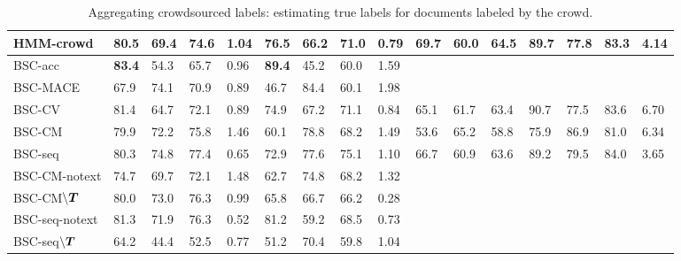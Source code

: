 \begin{table}
\begin{tabularx}{\textwidth}{p{2.0cm} X X X X X X X X X X X X X X X }
HMM-crowd & 80.5 & 69.4 & 74.6 & %
1.04 &  76.5 & 66.2 & 71.0 & 0.79 & %
69.7 & 60.0 & 64.5 & 89.7 & 77.8 & 83.3 & 4.14
\\ 
\midrule
BSC-acc & \textbf{83.4} & 54.3 & 65.7 & %
0.96 &  \textbf{89.4} & 45.2 & 60.0 & %
1.59 &  \\ 
BSC-MACE & 67.9 & 74.1 & 70.9 & %
0.89 &  46.7 & 84.4 & 60.1 & %
 1.98 & \\ 
BSC-CV & 81.4 & 64.7 & 72.1 & %
0.89 &  74.9 & 67.2 & 71.1 & %
 0.84 & 
65.1 & 61.7 & 63.4 & 90.7 & 77.5 & 83.6 & 6.70 
 \\ 
BSC-CM & 79.9 & 72.2 & 75.8 & %
1.46 & 60.1 & 78.8 & 68.2 & %
1.49 & 
53.6 & 65.2 & 58.8 & 75.9 & 86.9 & 81.0 & 6.34 \\ 
BSC-seq & 80.3 & 74.8 & 77.4 & %
0.65 & 
72.9 & 77.6 & 75.1 & %
1.10 & 66.7 & 60.9 & 63.6 & 89.2 & 79.5 & 84.0 & 
3.65 \\ \midrule
BSC-CM-notext & 74.7 & 69.7 & 72.1 & 1.48 & 62.7 & 74.8 & 68.2 & 1.32 & \\
BSC-CM$\backslash\boldsymbol T$ & 80.0 & 73.0 & 76.3 & 0.99 & 65.8 & 66.7 & 66.2 & 0.28 & \\
BSC-seq-notext & 81.3 & 71.9 & 76.3 & 0.52 & 81.2 & 59.2 & 68.5 & 0.73 &\\ 
BSC-seq$\backslash\boldsymbol T$ & 64.2 & 44.4 & 52.5 & 0.77 & 51.2 & 70.4 & 59.8 & 1.04 &\\
\bottomrule  %
\end{tabularx}
\caption{Aggregating crowdsourced labels: estimating true labels for documents labeled by the crowd.}
\label{tab:aggregation_results}
\npnoround
\end{table}

